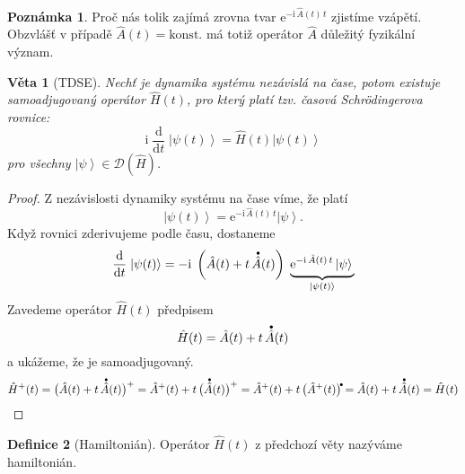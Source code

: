 \documentclass[10pt,a4paper]{report}
\newtheorem{theorem}{Věta}[section]
\theoremstyle{definition}
\newtheorem{definition}[theorem]{Definice}
\newtheorem*{remark}{Poznámka}
\def\vph{\vphantom}
\newcommand{\const}[1]{\mathrm{#1}}
\newcommand{\dd}[2]{\frac{\const{d} #1}{\const{d} #2} \;}
\newcommand{\ket}[1]{\left| #1 \right>}
\newcommand{\e}[1]{\const{e}^{#1}}
\newcommand{\I}{\const{i}}
\def\domain{\mathcal{D}}
\newcommand{\bigdot}[1]{\accentset{\bullet}{#1}}
\def\konst{\mathrm{konst.}}
\begin{document}
\begin{remark}
Proč nás tolik zajímá zrovna tvar $\e{-\I \, \hat A(t) \, t}$ zjistíme vzápětí. Obzvlášť v případě $\hat A(t) = \konst$ má totiž operátor $\hat A$ důležitý fyzikální význam.
\end{remark}

\begin{theorem}[TDSE]
    Nechť je dynamika systému nezávislá na čase, potom existuje samoadjugovaný operátor $\hat H(t)$, pro který platí tzv. časová Schrödingerova rovnice:
    \begin{equation*}
        \I \; \dd{}{t} \! \ket{\psi(t)} = \hat H(t) \ket{\psi(t)}
    \end{equation*}
    pro všechny $\ket{\psi} \in \domain(\hat H)$.
\end{theorem}
\begin{proof}
    Z nezávislosti dynamiky systému na čase víme, že platí
    \begin{equation*}
        \ket{\psi(t)} = \e{-\I \, \hat A(t) \, t} \ket{\psi}.
    \end{equation*}
    Když rovnici zderivujeme podle času, dostaneme
    \begin{equation*}
        \dd{}{t} \! \ket{\psi(t)} = -\I \; \left( \hat A(t) + t \, \bigdot{\hat A}(t) \right) \; \underbrace{ \e{-\I \, \hat A(t) \, t} \ket{\psi} \vph{\big|}}_{\ket{\psi(t)}}
    \end{equation*}
    Zavedeme operátor $\hat H(t)$ předpisem
    \begin{equation*}
        \hat H(t) = \hat A(t) + t \, \bigdot{\hat A}(t)
    \end{equation*}
    a ukážeme, že je samoadjugovaný.
    \begin{equation*}
        \hat H^+(t)
        = \big( \hat A(t) + t \, \bigdot{\hat A}(t) \big)^+
        = \hat A^+(t) + t \, \big(\bigdot{\hat A}(t) \big)^+
        = \hat A^+(t) + t \, \big(\hat A^+(t) \big)^{\bigdot{}}
        = \hat A(t) + t \, \bigdot{\hat A}(t)
        = \hat H(t)
    \end{equation*}
\end{proof}

\begin{definition}[Hamiltonián]
    Operátor $\hat H(t)$ z předchozí věty nazýváme hamiltonián.
\end{definition}
\end{document}
